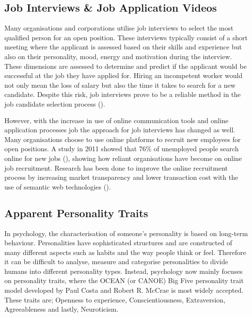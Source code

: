 \subsection{Job Interviews \& Job Application Videos}
Many organisations and corporations utilise job interviews to select the most qualified person for an open position. These interviews typically consist of a short meeting where the applicant is assessed based on their skills and experience but also on their personality, mood, energy and motivation during the interview. These dimensions are assessed to determine and predict if the applicant would be successful at the job they have applied for. Hiring an incompetent worker would not only mean the loss of salary but also the time it takes to search for a new candidate. Despite this risk, job interviews prove to be a reliable method in the job candidate selection process (\cite{weekley1987reliability}). 

However, with the increase in use of online communication tools and online application processes job the approach for job interviews has changed as well. Many organisations choose to use online platforms to recruit new employees for open positions. A study in 2011 showed that 76\% of unemployed people search online for new jobs (\cite{faberman2016does}), showing how reliant organisations have become on online job recruitment. Research has been done to improve the online recruitment process by increasing market transparency and lower transaction cost with the use of semantic web technologies (\cite{bizer2005impact}).  

\subsection{Apparent Personality Traits}
In psychology, the characterisation of someone's personality is based on long-term behaviour. Personalities have sophisticated structures and are constructed of many different aspects such as habits and the way people think or feel. Therefore it can be difficult to analyse, measure and categorise personalities to divide humans into different personality types. Instead, psychology now mainly focuses on personality traits, where the OCEAN (or CANOE) Big Five personality trait model developed by Paul Costa and Robert R. McCrae is most widely accepted. These traits are; Openness to experience, Conscientiousness, Extraversion, Agreeableness and lastly, Neuroticism. 

